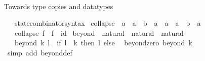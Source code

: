 \begin{isabellebody}
\isanewline
{}\isamarkupfalse%
%
\isadelimproof
\ %
\endisadelimproof
%
\isatagproof
\isacommand{{\isachardot}{\kern0pt}{\isachardot}{\kern0pt}}\isamarkupfalse%
%
\endisatagproof
{\isafoldproof}%
%
\isadelimproof
%
\endisadelimproof
\isanewline
\isanewline
{}\isamarkupfalse%
%
\begin{isamarkuptext}%
Towards type copies and datatypes%
\end{isamarkuptext}\isamarkuptrue%
\isamarkupfalse%
\isanewline
\ \ \ state{\isacharunderscore}{\kern0pt}combinator{\isacharunderscore}{\kern0pt}syntax\isanewline
{}\isanewline
\isanewline
{}\isamarkupfalse%
\ collapse\ {\isacharcolon}{\kern0pt}{\isacharcolon}{\kern0pt}\ {\isachardoublequoteopen}{\isacharparenleft}{\kern0pt}{\isacharprime}{\kern0pt}a\ {\isasymRightarrow}\ {\isacharparenleft}{\kern0pt}{\isacharprime}{\kern0pt}a\ {\isasymRightarrow}\ {\isacharprime}{\kern0pt}b\ {\isasymtimes}\ {\isacharprime}{\kern0pt}a{\isacharparenright}{\kern0pt}\ {\isasymtimes}\ {\isacharprime}{\kern0pt}a{\isacharparenright}{\kern0pt}\ {\isasymRightarrow}\ {\isacharprime}{\kern0pt}a\ {\isasymRightarrow}\ {\isacharprime}{\kern0pt}b\ {\isasymtimes}\ {\isacharprime}{\kern0pt}a{\isachardoublequoteclose}\isanewline
\ \ \ {\isachardoublequoteopen}collapse\ f\ {\isacharequal}{\kern0pt}\ {\isacharparenleft}{\kern0pt}f\ {\isasymcirc}{\isasymrightarrow}\ id{\isacharparenright}{\kern0pt}{\isachardoublequoteclose}\isanewline
\isanewline
{}\isamarkupfalse%
\isanewline
\isanewline
{}\isamarkupfalse%
\ beyond\ {\isacharcolon}{\kern0pt}{\isacharcolon}{\kern0pt}\ {\isachardoublequoteopen}natural\ {\isasymRightarrow}\ natural\ {\isasymRightarrow}\ natural{\isachardoublequoteclose}\isanewline
\ \ \ {\isachardoublequoteopen}beyond\ k\ l\ {\isacharequal}{\kern0pt}\ {\isacharparenleft}{\kern0pt}if\ l\ {\isachargreater}{\kern0pt}\ k\ then\ l\ else\ {}{\isacharparenright}{\kern0pt}{\isachardoublequoteclose}\isanewline
\isanewline
{}\isamarkupfalse%
\ beyond{\isacharunderscore}{\kern0pt}zero{\isacharcolon}{\kern0pt}\ {\isachardoublequoteopen}beyond\ k\ {}\ {\isacharequal}{\kern0pt}\ {}{\isachardoublequoteclose}\isanewline
%
\isadelimproof
\ \ %
\endisadelimproof
%
\isatagproof
{}\isamarkupfalse%
\ {\isacharparenleft}{\kern0pt}simp\ add{\isacharcolon}{\kern0pt}\ beyond{\isacharunderscore}{\kern0pt}def{\isacharparenright}{\kern0pt}%
\endisatagproof

\end{isabellebody}
